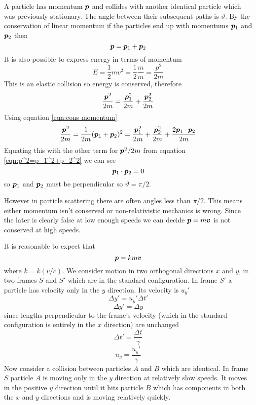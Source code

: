 \documentclass{article}
\begin{document}
    A particle has momentum \(\bm{p}\) and collides with another identical particle which was previously stationary. 
    The angle between their subsequent paths is \(\vartheta\).
    By the conservation of linear momentum if the particles end up with momentums \(\bm{p}_1\) and \(\bm{p}_2\) then
    \begin{equation}\label{eqn:cons momentum}
        \bm{p} = \bm{p}_1 + \bm{p}_2
    \end{equation}
    It is also possible to express energy in terms of momentum
    \[E = \frac{1}{2} mv^2 = \frac{1}{2}\frac{m}{m} = \frac{p^2}{2m}\]
    This is an elastic collision so energy is conserved, therefore
    \begin{equation}\label{eqn:p^2=p_1^2+p_2^2}
        \frac{\bm{p}^2}{2m} = \frac{\bm{p}_1^2}{2m} + \frac{\bm{p}_2^2}{2m}
    \end{equation}
    Using equation \ref{eqn:cons momentum}
    \[\frac{\bm{p}^2}{2m} = \frac{1}{2m}(\bm{p}_1 + \bm{p}_2)^2 = \frac{\bm{p}_1^2}{2m} + \frac{\bm{p}_2^2}{2m} + \frac{2\bm{p}_1\cdot\bm{p}_2}{2m}\]
    Equating this with the other term for \(\bm{p}^2/2m\) from equation \ref{eqn:p^2=p_1^2+p_2^2} we can see
    \[\bm{p}_1\cdot\bm{p}_2 = 0\]
    so \(\bm{p}_1\) and \(\bm{p}_2\) must be perpendicular so \(\vartheta = \pi/2\).
    
    However in particle scattering there are often angles less than \(\pi/2\).
    This means either momentum isn't conserved or non-relativistic mechanics is wrong. 
    Since the later is clearly false at low enough speeds we can decide
    \(\bm{p} = m\bm{v}\) is not conserved at high speeds.
    
    It is reasonable to expect that
    \[\bm{p} = km\bm{v}\]
    where \(k = k(v/c)\).
    We consider motion in two orthogonal directions \(x\) and \(y\), in two frames \(S\) and \(S'\) which are in the standard configuration.
    In frame \(S'\) a particle has velocity only in the \(y\) direction.
    Its velocity is \(u_y'\)
    \[\Delta y' = u_y'\Delta t'\]
    \[\Delta y' = \Delta y\]
    since lengths perpendicular to the frame's velocity (which in the standard configuration is entirely in the \(x\) direction) are unchanged
    \[\Delta t' = \frac{\Delta t}{\gamma}\]
    \[u_y = \frac{u_y'}{\gamma}\]
    Now consider a collision between particles \(A\) and \(B\) which are identical.
    In frame \(S\) particle \(A\) is moving only in the \(y\) direction at relatively slow speeds. 
    It moves in the positive \(y\) direction until it hits particle \(B\) which has components in both the \(x\) and \(y\) directions and is moving relatively quickly.
    
\end{document}

